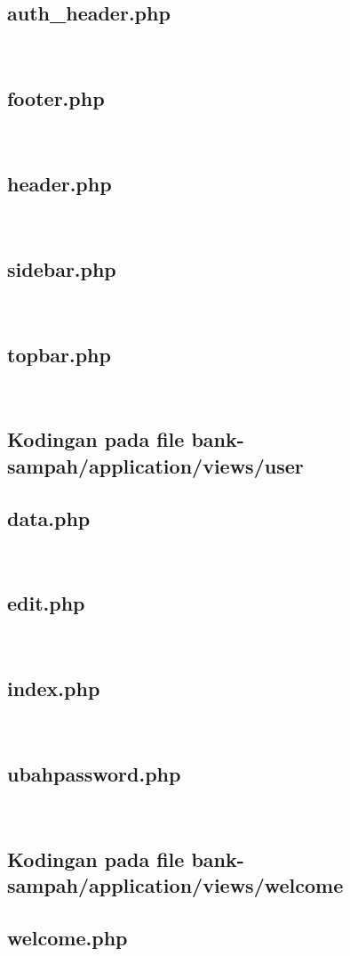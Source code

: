 \subsection{auth\_header.php}
\hfill\\

\subsection{footer.php}
\hfill\\

\subsection{header.php}
\hfill\\

\subsection{sidebar.php}
\hfill\\

\subsection{topbar.php}
\hfill\\


\subsection{Kodingan pada file bank-sampah/application/views/user}
\subsection{data.php}
\hfill\\

\subsection{edit.php}
\hfill\\

\subsection{index.php}
\hfill\\

\subsection{ubahpassword.php}
\hfill\\


\subsection{Kodingan pada file bank-sampah/application/views/welcome}
\subsection{welcome.php}
\hfill\\
